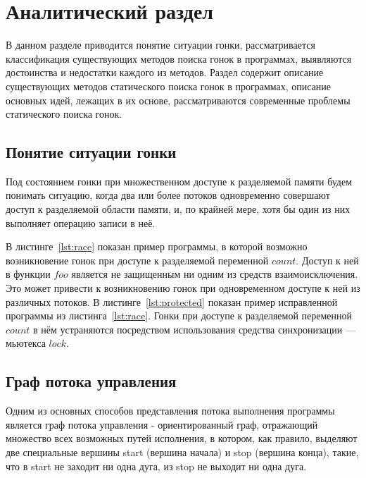 \chapter{Аналитический раздел}
\label{cha:analysis}

В данном разделе приводится понятие ситуации гонки, рассматривается классификация существующих методов поиска гонок в программах, выявляются достоинства и недостатки каждого из методов. Раздел содержит описание существующих методов статического поиска гонок в программах, описание основных идей, лежащих в их основе, рассматриваются современные проблемы статического поиска гонок.

\section{Понятие ситуации гонки}

Под состоянием гонки при множественном доступе к разделяемой памяти будем понимать ситуацию, когда два или более потоков одновременно совершают доступ к разделяемой области памяти, и, по крайней мере, хотя бы один из них выполняет операцию записи в неё.

В листинге~\ref{lst:race} показан пример программы, в которой возможно возникновение гонок при доступе к разделяемой переменной $count$. Доступ к ней в функции $foo$ является не защищенным ни одним из средств взаимоисключения. Это может привести к возникновению гонок при одновременном доступе к ней из различных потоков. В листинге~\ref{lst:protected} показан пример исправленной программы из листинга~\ref{lst:race}. Гонки при доступе к разделяемой переменной $count$ в нём устраняются посредством использования средства синхронизации — мьютекса $lock$.





\section{Граф потока управления}

Одним из основных способов представления потока выполнения программы является граф потока управления - ориентированный граф, отражающий множество всех возможных путей исполнения, в котором, как правило, выделяют две специальные вершины start (вершина начала) и stop (вершина конца), такие, что в start не заходит ни одна дуга, из stop не выходит ни одна дуга.


